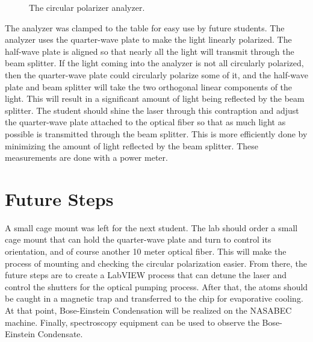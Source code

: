   \begin{figure}[h!]
\begin{center}
\end{center}
\caption{The circular polarizer analyzer. }
\end{figure}

The analyzer was clamped to the table for easy use by future students. The analyzer uses the quarter-wave plate to make the light linearly polarized. The half-wave plate is aligned so that nearly all the light will transmit through the beam splitter. If the light coming into the analyzer is not all circularly polarized, then the quarter-wave plate could circularly polarize some of it, and the half-wave plate and beam splitter will take the two orthogonal linear components of the light. This will result in a significant amount of light being reflected by the beam splitter. The student should shine the laser through this contraption and adjust the quarter-wave plate attached to the optical fiber so that as much light as possible is transmitted through the beam splitter. This is more efficiently done by minimizing the amount of light reflected by the beam splitter. These measurements are done with a power meter. 
\section{Future Steps}

A small cage mount was left for the next student. The lab should order a small cage mount that can hold the quarter-wave plate and turn to control its orientation, and of course another 10 meter optical fiber. This will make the process of mounting and checking the circular polarization easier. From there, the future steps are to create a LabVIEW process that can detune the laser and control the shutters for the optical pumping process. After that, the atoms should be caught in a magnetic trap and transferred to the chip for evaporative cooling. At that point, Bose-Einstein Condensation will be realized on the NASABEC machine. Finally, spectroscopy equipment can be used to observe the Bose-Einstein Condensate. 
